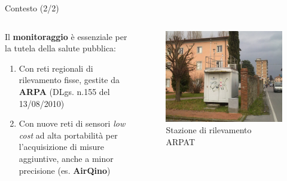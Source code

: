 \begin{frame}{Contesto (2/2)}

\begin{columns}

\begin{column}{0.65\textwidth}

Il \textbf{monitoraggio} è essenziale per la tutela della salute pubblica:\vspace{0.2cm}
 \begin{enumerate}
 \item Con reti regionali di rilevamento fisse, gestite da \textbf{ARPA} (DLgs. n.155 del 13/08/2010)\vspace{0.2cm}
 \item Con nuove reti di sensori \textit{low cost} ad alta portabilità per l'acquisizione di misure aggiuntive, anche a minor precisione (es. \textbf{AirQino})
\end{enumerate}

\end{column}

\begin{column}{0.37\textwidth}\vspace{0.5cm}
\begin{figure}[H]
\centering
\captionsetup{justification=centering}
\includegraphics[width=\textwidth]{images/lu-capannori}
\caption{Stazione di rilevamento ARPAT}
\end{figure}
\end{column}

\end{columns}

\end{frame}

